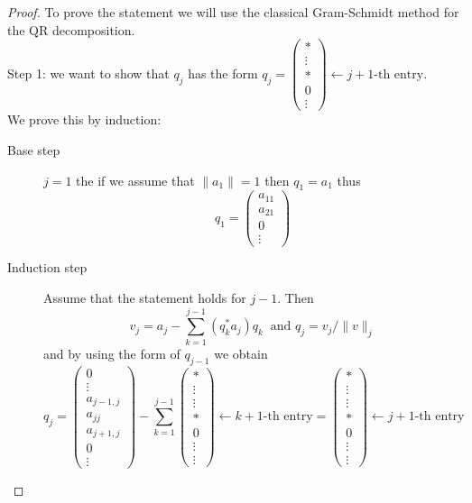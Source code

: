 \documentclass{report}
\numberwithin{pic}{section}
\numberwithin{lem}{section}
\numberwithin{thm}{section}
\numberwithin{cor}{section}
\theoremstyle{definition}
\numberwithin{ex}{section}
\numberwithin{defn}{section}
\theoremstyle{definition}
\theoremstyle{remark}
\begin{document}
\begin{proof}
To prove the statement we will use the classical Gram-Schmidt method for the QR decomposition.\\
Step 1: we want to show that $q_j$ has the form $q_j=\begin{pmatrix}
* \\ 
\vdots \\ 
* \\ 
0 \\ 
\vdots
\end{pmatrix} \leftarrow j+1\text{-th entry}$.\\
We prove this by induction:
\begin{description}
\item[Base step] $j=1$ the if we assume that $\|a_1\|=1$ then $q_1=a_1$ thus
\[q_1= \begin{pmatrix}
a_{11} \\ 
a_{21} \\ 
0 \\  
\vdots
\end{pmatrix}\]
\item[Induction step] Assume that the statement holds for $j-1$. Then
\[v_j=a_j-\sum_{k=1}^{j-1} (q_k^* a_j)q_k~\text{ and } q_j= v_j/\|v\|_j\]
and by using the form of $q_{j-1}$ we obtain
\[q_j= \begin{pmatrix}
0\\ 
\vdots \\ 
a_{j-1, j} \\ 
a_{jj} \\ 
a_{j+1,j} \\
0\\
\vdots
\end{pmatrix}-\sum_{k=1}^{j-1} \begin{pmatrix}
*\\ 
\vdots \\ 
\vdots \\ 
* \\ 
0 \\
\vdots\\
\vdots
\end{pmatrix}\leftarrow k+1\text{-th entry}= \begin{pmatrix}
*\\ 
\vdots \\ 
\vdots \\ 
* \\ 
0 \\
\vdots\\
\vdots
\end{pmatrix}\leftarrow j+1\text{-th entry} \]

\end{description}
\end{proof}
\end{document}
